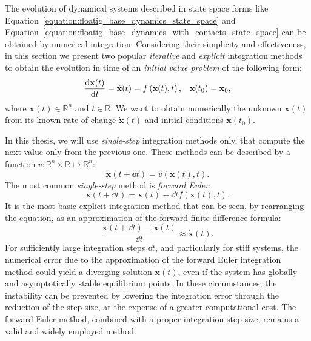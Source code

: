 The evolution of dynamical systems described in state space forms like Equation~\eqref{equation:floatig_base_dynamics_state_space} and Equation~\eqref{equation:floatig_base_dynamics_with_contacts_state_space} can be obtained by numerical integration.
Considering their simplicity and effectiveness, in this section we present two popular \emph{iterative} and \emph{explicit} integration methods to obtain the evolution in time of an \emph{initial value problem} of the following form:
%
\begin{align*}
    \dv{\mathbf{x}(t)}{t} = \dot{\mathbf{x}}(t) = f\left(\mathbf{x}(t), t\right),
    &&
    \mathbf{x}(t_0) = \mathbf{x}_0
    ,
\end{align*}
%
where $\mathbf{x}(t) \in \mathbb{R}^n$ and $t \in \mathbb{R}$.
We want to obtain numerically the unknown $\mathbf{x}(t)$ from its known rate of change $\dot{\mathbf{x}}(t)$ and initial conditions $\mathbf{x}(t_0)$.

In this thesis, we will use \emph{single-step} integration methods only, that compute the next value only from the previous one.
These methods can be described by a function $v: \mathbb{R}^n \times \mathbb{R} \mapsto \mathbb{R}^n$:
%
\begin{equation*}
    \mathbf{x}(t + \dd{t}) = v\left(\mathbf{x}(t), t\right) .
\end{equation*}
%
The most common \emph{single-step} method is \emph{forward Euler}:
%
\begin{equation*}
    \mathbf{x}(t + \dd{t}) = \mathbf{x}(t) + \dd{t} f\left(\mathbf{x}(t), t\right)
    .
\end{equation*}
%
It is the most basic explicit integration method that can be seen, by rearranging the equation, as an approximation of the forward finite difference formula:
%
\begin{equation*}
    \frac{\mathbf{x}(t + \dd{t}) - \mathbf{x}(t)}{\dd{t}} \approx \dot{\mathbf{x}}(t)
    .
\end{equation*}
%
For sufficiently large integration steps $\dd{t}$, and particularly for stiff systems, the numerical error due to the approximation of the forward Euler integration method could yield a diverging solution $\mathbf{x}(t)$, even if the system has globally and asymptotically stable equilibrium points.
In these circumstances, the instability can be prevented by lowering the integration error through the reduction of the step size, at the expense of a greater computational cost.
The forward Euler method, combined with a proper integration step size, remains a valid and widely employed method.

